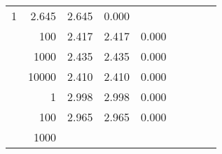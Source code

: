 \begin{table}
\begin{tabular}{rrrrrrrrr}
					
					 
					\multirow{ 1 }{*}{ 1 } &
					
						
							    
							    
	                           2.645 & 2.645 & 0.000  \\
	                
	            
					 &  
					 
					\multirow{ 1 }{*}{ 100 } &
					
						
							    
							    
	                           2.417 & 2.417 & 0.000  \\
	                
	            
					 &  
					 
					\multirow{ 1 }{*}{ 1000 } &
					
						
							    
							    
	                           2.435 & 2.435 & 0.000  \\
	                
	            
					 &  
					 
					\multirow{ 1 }{*}{ 10000 } &
					
						
							    
							    
	                           2.410 & 2.410 & 0.000  \\
	                
	            
	        
				\noalign{\smallskip}\hline
				\multirow{ 4 }{*}{ 160000 } &
				
					
					 
					\multirow{ 1 }{*}{ 1 } &
					
						
							    
							    
	                           2.998 & 2.998 & 0.000  \\
	                
	            
					 &  
					 
					\multirow{ 1 }{*}{ 100 } &
					
						
							    
							    
	                           2.965 & 2.965 & 0.000  \\
	                
	            
					 &  
					 
					\multirow{ 1 }{*}{ 1000 } &
					

\end{tabular}
\end{table}
